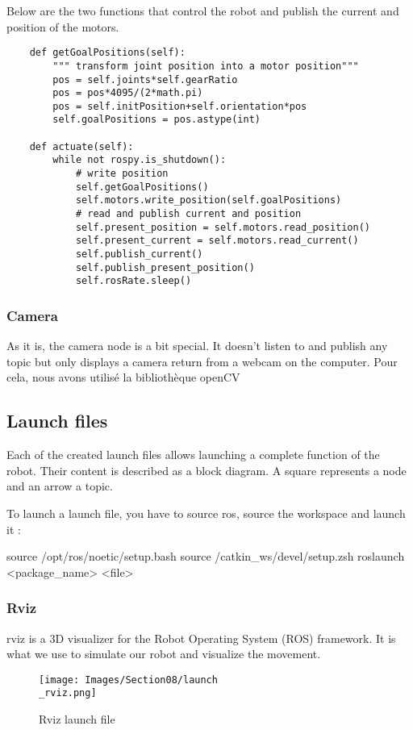 \bigbreak
Below are the two functions that control the robot and publish the current and position of the motors.
\begin{verbatim}
    def getGoalPositions(self):
        """ transform joint position into a motor position"""
        pos = self.joints*self.gearRatio
        pos = pos*4095/(2*math.pi)
        pos = self.initPosition+self.orientation*pos
        self.goalPositions = pos.astype(int)
        
    def actuate(self):
        while not rospy.is_shutdown():
            # write position
            self.getGoalPositions()
            self.motors.write_position(self.goalPositions)
            # read and publish current and position
            self.present_position = self.motors.read_position()
            self.present_current = self.motors.read_current()
            self.publish_current()
            self.publish_present_position()
            self.rosRate.sleep()
\end{verbatim}

\subsubsection{Camera}
As it is, the camera node is a bit special. It doesn't listen to and publish any topic but only displays a camera return from a webcam on the computer. Pour cela, nous avons utilisé la bibliothèque openCV

\subsection{Launch files}

Each of the created launch files allows launching a complete function of the robot. Their content is described as a block diagram. A square represents a node and an arrow a topic. 

\bigbreak
To launch a launch file, you have to source ros, source the workspace and launch it :
\begin{commandshell}
    source /opt/ros/noetic/setup.bash
    source /catkin_ws/devel/setup.zsh
    roslaunch <package_name> <file>
\end{commandshell} 

\subsubsection{Rviz}

rviz is a 3D visualizer for the Robot Operating System (ROS) framework. It is what we use to simulate our robot and visualize the movement.
\bigbreak
\begin{figure}[ht]
    \centering
    \texttt{[image: Images/Section08/launch\\\_rviz.png]}
    \caption{Rviz launch file}
    \label{fig:RvizLaunch}
\end{figure}
\FloatBarrier

